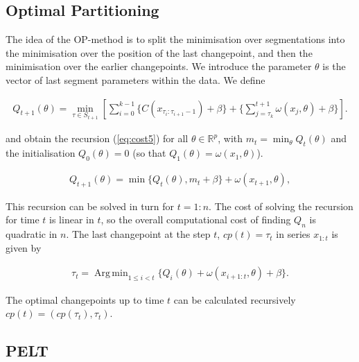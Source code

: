 \documentclass[a4paper,12pt]{article}
\DeclareMathOperator*{\argmin}{Arg\,min}
\begin{document}
		\subsection{Optimal Partitioning}
		\label{OP}
		
		The idea of the OP-method is to split the minimisation over segmentations into the minimisation over the position of the last changepoint, and then the minimisation over the earlier changepoints.
		We introduce the parameter $\theta$ is the vector of last segment parameters within the data. We define
		
		 \begin{equation}
			\begin{gathered}
				Q_{t+1} (\theta) = \min_{\tau \in S_{t+1}}\left[ \sum_{i=0}^{k-1} \{C(x_{\tau_i:\tau_{i+1}-1})+\beta\} + \{ \sum_{j=\tau_{k}}^{t+1}  \omega(x_j, \theta)+\beta \} \right].
			\end{gathered}
			\label{eq:cost4}
		\end{equation}
	
	 	and obtain the recursion (\ref{eq:cost5}) for all  $\theta \in\mathbb{R}^p$, with $m_t = \min_\theta Q_t(\theta)$ and the initialisation $Q_0(\theta) = 0$ (so that $Q_1(\theta) = \omega(x_1, \theta)$).
	 	
	 	 \begin{equation}
	 		\begin{gathered}
	 			Q_{t+1} (\theta) = \min \{Q_t(\theta),m_t +\beta \} +\omega(x_{t+1}, \theta),
	 		\end{gathered}
	 		\label{eq:cost5}
	 	\end{equation}
	 	 
	 	 This recursion can be solved in turn for $t = 1:n$. The cost of solving the recursion for time $t$ is linear in $t$, so the overall computational cost of finding $Q_n$ is quadratic in $n$. The last changepoint at the step $t$, $cp(t) = \tau_t$ in series  $x_{1:t}$ is given by

		 \begin{equation}
		 	\begin{gathered}
		 		\tau_t = \argmin_{1 \le i < t}\{ Q_i(\theta) + \omega(x_{i+1:t}, \theta) +\beta\}.
		 	\end{gathered}
		 	\label{eq:tau2}
		\end{equation}
			
		The optimal changepoints up to time $t$ can be calculated recursively $cp(t) = (cp(\tau_t), \tau_t)$.
		
		\subsection{PELT}
		\label{PELT}
		
\end{document}
